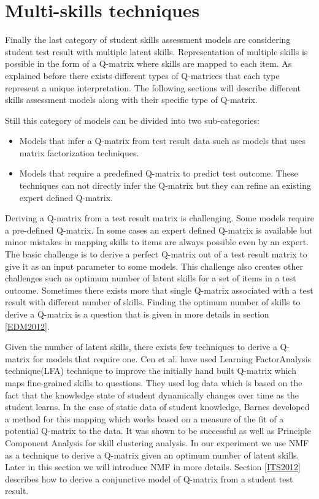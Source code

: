 \section{Multi-skills techniques}
\label{NMF_DESC}
Finally the last category of student skills assessment models are considering student test result with multiple latent skills. Representation of multiple skills is possible in the form of a Q-matrix where skills are mapped to each item. As explained before there exists different types of Q-matrices that each type represent a unique interpretation. The following sections will describe different skills assessment models along with their specific type of Q-matrix.


Still this category of models can be divided into two sub-categories: 
\begin{itemize}
\item Models that infer a Q-matrix from test result data such as models that uses matrix factorization techniques.
\item Models that require a predefined Q-matrix to predict test outcome. These techniques can not directly infer the Q-matrix but they can refine an existing expert defined Q-matrix.
\end{itemize}

Deriving a Q-matrix from a test result matrix is challenging. Some models require a pre-defined Q-matrix. In some cases an expert defined Q-matrix is available but minor mistakes in mapping skills to items are always possible even by an expert. The basic challenge is to derive a perfect Q-matrix out of a test result matrix to give it as an input parameter to some models. This challenge also creates other challenges  such as optimum number of latent skills for a set of items in a test outcome. Sometimes there exists more that single Q-matrix associated with a test result with different number of skills. Finding the optimum number of skills to derive a Q-matrix is a question that is given in more details in section \ref{EDM2012}. 

Given the number of latent skills, there exists few techniques to derive a Q-matrix for models that require one. Cen et al. \citep{Cen2005,Cen2006} have used Learning FactorAnalysis technique(LFA) technique to improve the initially hand built Q-matrix which maps fine-grained skills to questions. They used log data which is based on the fact that the knowledge state of student dynamically changes over time as the student learns. In the case of static data of student knowledge, Barnes \citep{Barnes06} developed a method for this mapping which works based on a measure of the fit of a potential Q-matrix to the data. It was shown to be successful as well as Principle Component Analysis for skill clustering analysis. In our experiment we use NMF as a technique to derive a Q-matrix given an optimum number of latent skills. Later in this section we will introduce NMF in more details. Section \ref{ITS2012} describes how to derive a conjunctive model of Q-matrix from a student test result.

